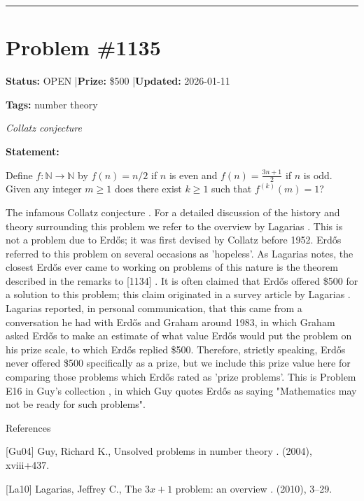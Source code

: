 \documentclass{article}
\begin{document}
\noindent\rule{\linewidth}{0.4pt}


\section{Problem \#1135}
\label{prob:1135}

\noindent\textbf{Status:} OPEN \quad|\quad \textbf{Prize:} \$500 \quad|\quad \textbf{Updated:} 2026-01-11

\noindent\textbf{Tags:} number theory

\medskip
\noindent\textit{Collatz conjecture}


\noindent\textbf{Statement:}

Define $f:\mathbb{N}\to \mathbb{N}$ by $f(n)=n/2$ if $n$ is even and $f(n)=\frac{3n+1}{2}$ if $n$ is odd. Given any integer $m\geq 1$ does there exist $k\geq 1$ such that $f^{(k)}(m)=1$?




The infamous Collatz conjecture . For a detailed discussion of the history and theory surrounding this problem we refer to the overview by Lagarias \cite{La10}. This is not a problem due to Erd\H{o}s; it was first devised by Collatz before 1952. Erd\H{o}s referred to this problem on several occasions as 'hopeless'. As Lagarias \cite{La16} notes, the closest Erd\H{o}s ever came to working on problems of this nature is the theorem described in the remarks to [1134] . It is often claimed that Erd\H{o}s offered \$500 for a solution to this problem; this claim originated in a survey article by Lagarias \cite{La85}. Lagarias reported, in personal communication, that this came from a conversation he had with Erd\H{o}s and Graham around 1983, in which Graham asked Erd\H{o}s to make an estimate of what value Erd\H{o}s would put the problem on his prize scale, to which Erd\H{o}s replied \$500. Therefore, strictly speaking, Erd\H{o}s never offered \$500 specifically as a prize, but we include this prize value here for comparing those problems which Erd\H{o}s rated as 'prize problems'. This is Problem E16 in Guy's collection \cite{Gu04}, in which Guy quotes Erd\H{o}s as saying "Mathematics may not be ready for such problems".




References

[Gu04] Guy, Richard K., Unsolved problems in number theory . (2004), xviii+437.

[La10] Lagarias, Jeffrey C., The {$3x+1$} problem: an overview . (2010), 3--29.
\end{document}
